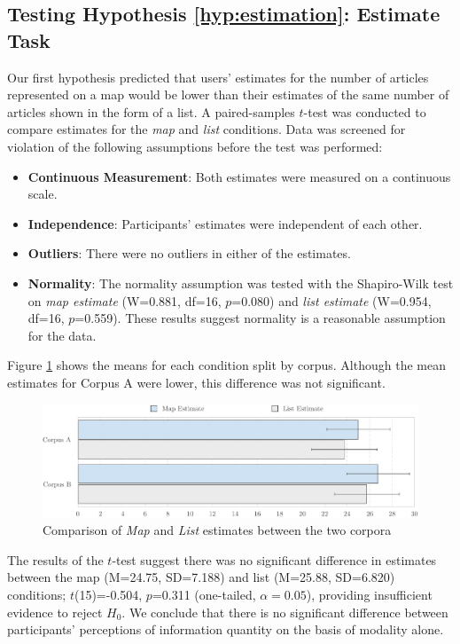 \subsection{Testing Hypothesis \ref{hyp:estimation}: Estimate Task}

Our first hypothesis predicted that users' estimates for the number of articles represented on a map would be lower than their estimates of the same number of articles shown in the form of a list. A paired-samples $t$-test was conducted to compare estimates for the \textit{map} and \textit{list} conditions. Data was screened for violation of the following assumptions before the test was performed:
\vspace{-0.2cm}
\begin{itemize}[label={},itemsep=0.05em]
	\item \textbf{Continuous Measurement}: Both estimates were measured on a continuous scale.
	\item \textbf{Independence}: Participants' estimates were independent of each other.
	\item \textbf{Outliers}: There were no outliers in either of the estimates.
	\item \textbf{Normality}: The normality assumption was tested with the Shapiro-Wilk test on \textit{map estimate} (W=0.881, df=16, $p$=0.080) and \textit{list estimate}  (W=0.954, df=16, $p$=0.559). These results suggest normality is a reasonable assumption for the data.
\end{itemize}

Figure \ref{fig:estimate} shows the means for each condition split by corpus. Although the mean estimates for Corpus A were lower, this difference was not significant.

\begin{figure}[htbp!]
	\centering
	\includegraphics[width=\textwidth]{img/evaluation/estimate.pdf}
	\caption{Comparison of \textit{Map} and \textit{List} estimates between the two corpora}
	\label{fig:estimate}
\end{figure}

The results of the $t$-test suggest there was no significant difference in estimates between the map (M=24.75, SD=7.188) and list (M=25.88, SD=6.820) conditions; $t$(15)=-0.504, $p$=0.311 (one-tailed, $\alpha=0.05$), providing insufficient evidence to reject $H_0$. We conclude that there is no significant difference between participants' perceptions of information quantity on the basis of modality alone.

